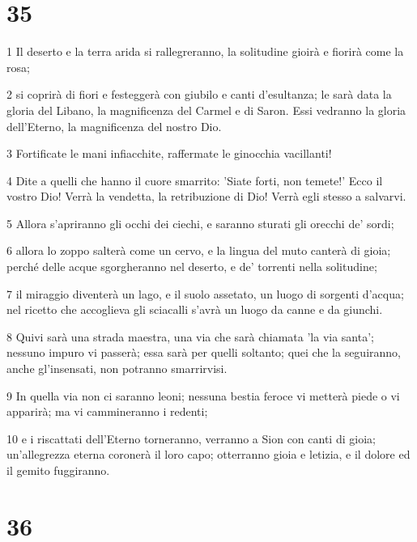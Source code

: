 \chapter{35}

\par 1 Il deserto e la terra arida si rallegreranno, la solitudine gioirà e fiorirà come la rosa;
\par 2 si coprirà di fiori e festeggerà con giubilo e canti d'esultanza; le sarà data la gloria del Libano, la magnificenza del Carmel e di Saron. Essi vedranno la gloria dell'Eterno, la magnificenza del nostro Dio.
\par 3 Fortificate le mani infiacchite, raffermate le ginocchia vacillanti!
\par 4 Dite a quelli che hanno il cuore smarrito: 'Siate forti, non temete!' Ecco il vostro Dio! Verrà la vendetta, la retribuzione di Dio! Verrà egli stesso a salvarvi.
\par 5 Allora s'apriranno gli occhi dei ciechi, e saranno sturati gli orecchi de' sordi;
\par 6 allora lo zoppo salterà come un cervo, e la lingua del muto canterà di gioia; perché delle acque sgorgheranno nel deserto, e de' torrenti nella solitudine;
\par 7 il miraggio diventerà un lago, e il suolo assetato, un luogo di sorgenti d'acqua; nel ricetto che accoglieva gli sciacalli s'avrà un luogo da canne e da giunchi.
\par 8 Quivi sarà una strada maestra, una via che sarà chiamata 'la via santa'; nessuno impuro vi passerà; essa sarà per quelli soltanto; quei che la seguiranno, anche gl'insensati, non potranno smarrirvisi.
\par 9 In quella via non ci saranno leoni; nessuna bestia feroce vi metterà piede o vi apparirà; ma vi cammineranno i redenti;
\par 10 e i riscattati dell'Eterno torneranno, verranno a Sion con canti di gioia; un'allegrezza eterna coronerà il loro capo; otterranno gioia e letizia, e il dolore ed il gemito fuggiranno.

\chapter{36}

